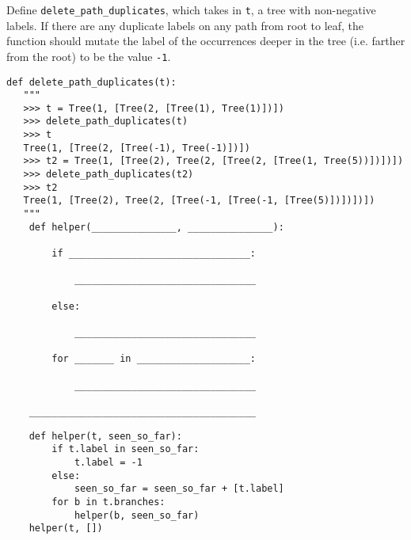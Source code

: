 \begin{blocksection}
\question
Define \texttt{delete\_path\_duplicates}, which takes in \texttt{t}, a tree
with non-negative labels. If there are any duplicate labels on any path 
from root to leaf, the function should mutate the label of the occurrences
deeper in the tree (i.e. farther from the root) to be the value \texttt{-1}.

\begin{lstlisting}
def delete_path_duplicates(t):
   """
   >>> t = Tree(1, [Tree(2, [Tree(1), Tree(1)])])
   >>> delete_path_duplicates(t)
   >>> t
   Tree(1, [Tree(2, [Tree(-1), Tree(-1)])])
   >>> t2 = Tree(1, [Tree(2), Tree(2, [Tree(2, [Tree(1, Tree(5))])])])
   >>> delete_path_duplicates(t2)
   >>> t2
   Tree(1, [Tree(2), Tree(2, [Tree(-1, [Tree(-1, [Tree(5)])])])])
   """
    def helper(_______________, _______________):

        if ________________________________:

            ________________________________

        else:

            ________________________________

        for _______ in ____________________:

            ________________________________

    ________________________________________

\end{lstlisting}
\end{blocksection}
\begin{blocksection}
\begin{solution}
\begin{lstlisting}
    def helper(t, seen_so_far):
        if t.label in seen_so_far:
            t.label = -1
        else:
            seen_so_far = seen_so_far + [t.label]
        for b in t.branches:
            helper(b, seen_so_far)
    helper(t, [])
\end{lstlisting}
\end{solution}
\end{blocksection}